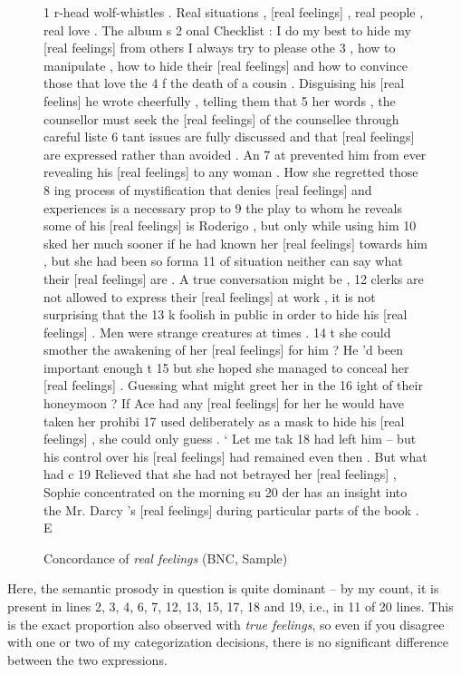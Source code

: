 \begin{figure}[!htbp]
\caption{Concordance of \textit{real feelings} (BNC, Sample)}
\label{fig:realfeelings}
\begin{fitverb}
 1 r-head wolf-whistles . Real situations , [real feelings] , real people , real love . The album s
 2 onal Checklist : I do my best to hide my [real feelings] from others I always try to please othe
 3  , how to manipulate , how to hide their [real feelings] and how to convince those that love the
 4 f the death of a cousin . Disguising his [real feelins] he wrote cheerfully , telling them that
 5 her words , the counsellor must seek the [real feelings] of the counsellee through careful liste
 6 tant issues are fully discussed and that [real feelings] are expressed rather than avoided . An 
 7 at prevented him from ever revealing his [real feelings] to any woman . How she regretted those 
 8 ing process of mystification that denies [real feelings] and experiences is a necessary prop to 
 9  the play to whom he reveals some of his [real feelings] is Roderigo , but only while using him 
10 sked her much sooner if he had known her [real feelings] towards him , but she had been so forma
11  of situation neither can say what their [real feelings] are . A true conversation might be , 
12  clerks are not allowed to express their [real feelings] at work , it is not surprising that the
13 k foolish in public in order to hide his [real feelings] . Men were strange creatures at times .
14 t she could smother the awakening of her [real feelings] for him ? He 'd been important enough t
15 but she hoped she managed to conceal her [real feelings] . Guessing what might greet her in the 
16 ight of their honeymoon ? If Ace had any [real feelings] for her he would have taken her prohibi
17  used deliberately as a mask to hide his [real feelings] , she could only guess . ` Let me tak
18  had left him -- but his control over his [real feelings] had remained even then . But what had c
19   Relieved that she had not betrayed her [real feelings] , Sophie concentrated on the morning su
20 der has an insight into the Mr. Darcy 's [real feelings] during particular parts of the book . E
\end{fitverb}
\end{figure}

Here, the semantic prosody in question is quite dominant -- by my count, it is present in lines 2, 3, 4, 6, 7, 12, 13, 15, 17, 18 and 19, i.e., in 11 of 20 lines. This is the exact proportion also observed with \textit{true feelings}, so even if you disagree with one or two of my categorization decisions, there is no significant difference between the two expressions.

